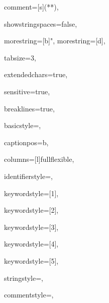 {%
comment=[s]{(*}{*)},

showstringspaces=false,

morestring=[b]",
morestring=[d],

tabsize=3,							

extendedchars=true,  		 		

sensitive=true, 

breaklines=true,

basicstyle=\sffamily,

captionpos=b,							

columns=[l]fullflexible,

identifierstyle={\sffamily\color{black}},

keywordstyle=[1]{\sffamily\color{dkviolet}},

keywordstyle=[2]{\sffamily\color{dkgreen}},

keywordstyle=[3]{\sffamily\color{lightblue}},

keywordstyle=[4]{\sffamily\color{dkblue}},

keywordstyle=[5]{\sffamily\color{red}},



stringstyle=\sffamily,

commentstyle={\ttfamily\footnotesize},

}

